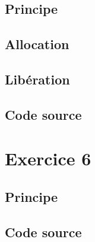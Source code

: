 \documentclass{report}
\begin{document}
    \section{Principe}
    \section{Allocation}
    \section{Libération}
    \section{Code source}
    
  \chapter{Exercice 6}
    \section{Principe}
    \section{Code source}
\end{document}
